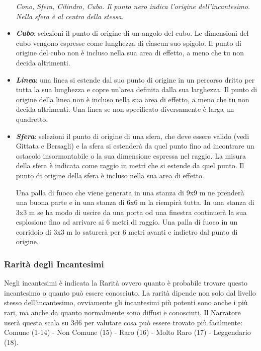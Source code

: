 \begin{multicols}{2}
\begin{itemize}[leftmargin=*]
\begin{center}
	\emph{Cono, Sfera, Cilindro, Cubo. Il punto nero indica l'origine dell'incantesimo. Nella sfera è al centro della stessa.}
\end{center}

\item \emph{\textbf{Cubo}}: selezioni il punto di origine di un angolo del cubo. Le dimensioni del cubo vengono espresse come lunghezza di ciascun suo spigolo. Il punto di origine del cubo non è incluso nella sua area di effetto, a meno che tu non decida altrimenti.

\item \emph{\textbf{Linea}}: una linea si estende dal suo punto di origine in un percorso dritto per tutta la sua lunghezza e copre un'area definita dalla sua larghezza. Il punto di origine della linea non è incluso nella sua area di effetto, a meno che tu non decida altrimenti. Una linea se non specificato diversamente è larga un quadretto.

\item \emph{\textbf{Sfera}}: selezioni il punto di origine di una sfera, che deve essere valido (vedi Gittata e Bersagli) e la sfera si estenderà da quel punto fino ad incontrare un ostacolo insormontabile o la sua dimensione espressa nel raggio. La misura della sfera è indicata come raggio in metri che si estende da quel punto. Il punto di origine della sfera è incluso nella sua area di effetto.

Una palla di fuoco che viene generata in una stanza di 9x9 m ne prenderà una buona parte e in una stanza di 6x6 m la riempirà tutta. In una stanza di 3x3 m se ha modo di uscire da una porta od una finestra continuerà la sua esplosione fino ad arrivare ai 6 metri di raggio. Una palla di fuoco in un corridoio di 3x3 m lo saturerà per 6 metri avanti e indietro dal punto di origine.

\end{itemize}

\subsubsection{Rarità degli Incantesimi}\label{magieraritaincantesimi}

Negli incantesimi è indicata la Rarità ovvero quanto è probabile trovare questo incantesimo o quanto può essere conosciuto. La rarità dipende non solo dal livello stesso dell'incantesimo, ovviamente gli incantesimi più potenti sono anche i più rari, ma anche da quanto normalmente sono diffusi e conosciuti. Il Narratore userà questa scala su 3d6 per valutare cosa può essere trovato più facilmente: %
Comune (1-14) - Non Comune (15) - Raro (16) - Molto Raro (17) - Leggendario (18).


\end{multicols}

